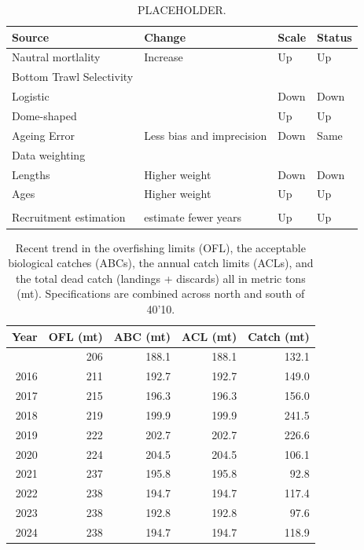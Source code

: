 \documentclass[
]{scrartcl}
\begin{document}
\newpage{}

\begingroup
\fontsize{9.0pt}{10.8pt}\selectfont

\begin{longtable}{llll}

\caption{\label{tbl-uncertainty_summary}PLACEHOLDER.}

\tabularnewline

\toprule
Source & Change & Scale & Status \\ 
\midrule\addlinespace[2.5pt]
Nautral mortlality & Increase & Up & Up \\ 
Bottom Trawl Selectivity &  &  &  \\ 
Logistic &  & Down & Down \\ 
Dome-shaped &  & Up & Up \\ 
Ageing Error & Less bias and imprecision & Down & Same \\ 
Data weighting &  &  &  \\ 
Lengths & Higher weight & Down & Down \\ 
Ages & Higher weight & Up & Up \\ 
 &  &  &  \\ 
Recruitment estimation & estimate fewer years & Up & Up \\ 
\bottomrule

\end{longtable}

\endgroup

\newpage{}

\begingroup
\fontsize{9.0pt}{10.8pt}\selectfont

\begin{longtable}{rrrrr}

\caption{\label{tbl-man-management}Recent trend in the overfishing
limits (OFL), the acceptable biological catches (ABCs), the annual catch
limits (ACLs), and the total dead catch (landings + discards) all in
metric tons (mt). Specifications are combined across north and south of
40'10.}

\tabularnewline

\toprule
Year & OFL (mt) & ABC (mt) & ACL (mt) & Catch (mt) \\ 
\midrule\addlinespace[2.5pt]
2015 & 206 & 188.1 & 188.1 & 132.1 \\ 
2016 & 211 & 192.7 & 192.7 & 149.0 \\ 
2017 & 215 & 196.3 & 196.3 & 156.0 \\ 
2018 & 219 & 199.9 & 199.9 & 241.5 \\ 
2019 & 222 & 202.7 & 202.7 & 226.6 \\ 
2020 & 224 & 204.5 & 204.5 & 106.1 \\ 
2021 & 237 & 195.8 & 195.8 & 92.8 \\ 
2022 & 238 & 194.7 & 194.7 & 117.4 \\ 
2023 & 238 & 192.8 & 192.8 & 97.6 \\ 
2024 & 238 & 194.7 & 194.7 & 118.9 \\ 
\bottomrule

\end{longtable}
\end{document}
